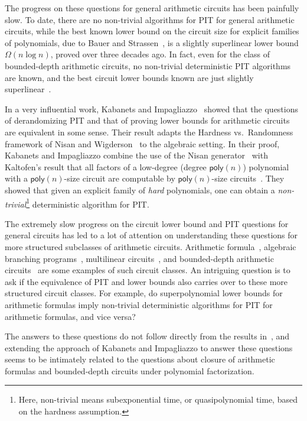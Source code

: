 \documentclass{toc}
\newcommand{\func}[1]{{\ensuremath{\mathsf{#1}}}}
\newcommand{\poly}{\func{poly}}
\begin{document}
The progress on these questions for general arithmetic circuits has been painfully slow. To date, there are no non-trivial algorithms for PIT for general arithmetic circuits, while the best known lower bound
%
on the circuit size for explicit families of polynomials, %
due to Bauer and Strassen~\cite{BS83}, is a slightly superlinear lower bound $\Omega(n\log n)$, proved over three decades ago. In fact, even for the class of
%
bounded-depth   %
arithmetic circuits, no non-trivial deterministic PIT algorithms are known, and the best
circuit  %
lower bounds known are just slightly superlinear~\cite{Raz10a}. 

In a very influential work, Kabanets and Impagliazzo~\cite{ki03} showed that the questions of derandomizing PIT and that of proving lower bounds for arithmetic circuits are equivalent in some sense. Their result adapts the
Hardness vs.\ Randomness %
%
%
framework of Nisan and Wigderson~\cite{nw94} to the algebraic setting.
In their proof, Kabanets and Impagliazzo combine the use of
%
the Nisan generator~\cite{nisan1991}   %
with Kaltofen's result that all factors of a 
%
low-degree %
(degree $\poly(n)$) polynomial with
%
a $\poly(n)$-size circuit  %
are computable by
%
$\poly(n)$-size   %
circuits~\cite{k89}. They showed that given an explicit family of
\emph{hard} polynomials, one can obtain a \emph{non-trivial}\footnote{Here, non-trivial means subexponential time, or quasipolynomial time, based on the hardness assumption.} deterministic algorithm for PIT. 

The extremely slow progress on the
circuit   %
lower bound and PIT questions for general circuits has led to a lot of attention on understanding these questions for more structured
%
subclasses    %
of arithmetic circuits. Arithmetic formula~\cite{k85}, algebraic branching programs~\cite{k17}, multilinear circuits~\cite{Raz06, raz-yehudayoff, RSY08}, and
%
bounded-depth   %
arithmetic circuits~\cite{nw1997, Raz10a, GKKS14, FLMS13, KS14} are some examples of such circuit classes. An intriguing question is to ask if the equivalence of PIT and lower bounds also carries over to these more structured circuit classes. For example,
%
do   %
%
superpolynomial   %
lower bounds for arithmetic formulas imply non-trivial deterministic algorithms for PIT for arithmetic formulas, and
%
vice versa? 

The answers to these questions do not follow directly from the results
in~\cite{ki03}, %
and extending the approach of Kabanets and Impagliazzo to answer these questions seems to be intimately related to the questions about closure of arithmetic formulas and
%
bounded-depth   %
circuits under polynomial factorization. 
\end{document}
